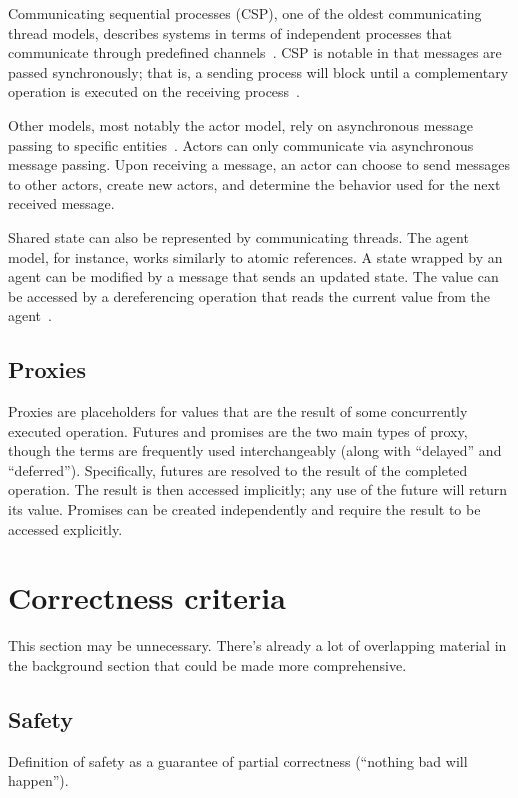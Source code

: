 \documentclass{sig-alternate}
\begin{document}
Communicating sequential processes (CSP), one of the oldest communicating thread models, describes systems in terms of independent processes that communicate through predefined channels~\cite{Hoare1978}. CSP is notable in that messages are passed synchronously; that is, a sending process will block until a complementary operation is executed on the receiving process~\cite{Swalens2014}.

Other models, most notably the actor model, rely on asynchronous message passing to specific entities~\cite{Agha1986}. Actors can only communicate via asynchronous message passing. Upon receiving a message, an actor can choose to send messages to other actors, create new actors, and determine the behavior used for the next received message.

Shared state can also be represented by communicating threads. The agent model, for instance, works similarly to atomic references. A state wrapped by an agent can be modified by a message that sends an updated state. The value can be accessed by a dereferencing operation that reads the current value from the agent~\cite{Swalens2014}.

\subsection{Proxies}

Proxies are placeholders for values that are the result of some concurrently executed operation. Futures and promises are the two main types of proxy, though the terms are frequently used interchangeably (along with ``delayed'' and ``deferred''). Specifically, futures are resolved to the result of the completed operation. The result is then accessed implicitly; any use of the future will return its value. Promises can be created independently and require the result to be accessed explicitly.

\section{Correctness criteria}

This section may be unnecessary. There's already a lot of overlapping material in the background section that could be made more comprehensive.

\subsection{Safety}

Definition of safety as a guarantee of partial correctness (``nothing bad will happen'').
\end{document}
